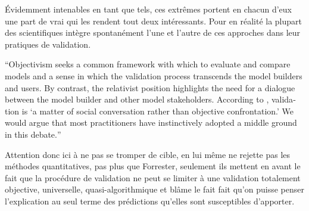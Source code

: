Évidemment intenables en tant que tels, ces extrêmes portent en chacun d'eux une part de vrai qui les rendent tout deux intéressants. Pour \textcite{Kleindorfer1998} en réalité la plupart des scientifiques intègre spontanément l'une et l'autre de ces approches dans leur pratiques de validation.

\foreignquote{english}{Objectivism seeks a common framework with which to evaluate and compare models and a sense in which the validation process transcends the model builders and users. By contrast, the relativist position highlights the need for a dialogue between the model builder and other model stakeholders. According to \autocite{Barlas1990}, validation is \enquote{a matter of social conversation rather than objective confrontation.} We would argue that most practitioners have instinctively adopted a middle ground in this debate.} \autocite[1098]{Kleindorfer1998}

Attention donc ici à ne pas se tromper de cible, \textcite[188]{Barlas1996} en lui même ne rejette pas les méthodes quantitatives, pas plus que Forrester, seulement ils mettent en avant le fait que la procédure de validation ne peut se limiter à une validation totalement objective, universelle, quasi-algorithmique et blâme le fait fait qu'on puisse penser l'explication au seul terme des prédictions qu'elles sont susceptibles d'apporter.





